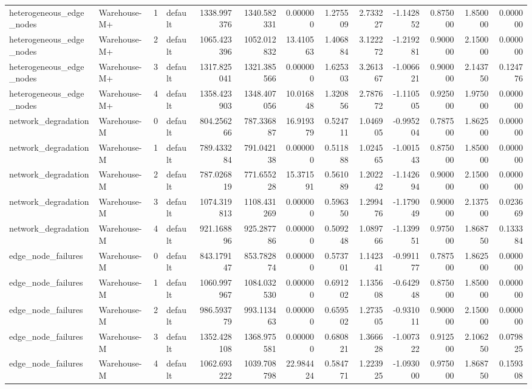 \begin{tabular}{llrlrrrrrrrrr}
heterogeneous\_edge\_nodes & Warehouse-M+ & 1 & default & 1338.997376 & 1340.582331 & 0.000000 & 1.275509 & 2.733227 & -1.142852 & 0.875000 & 1.850000 & 0.000000 \\
heterogeneous\_edge\_nodes & Warehouse-M+ & 2 & default & 1065.423396 & 1052.012832 & 13.410563 & 1.406884 & 3.122272 & -1.219281 & 0.900000 & 2.150000 & 0.000000 \\
heterogeneous\_edge\_nodes & Warehouse-M+ & 3 & default & 1317.825041 & 1321.385566 & 0.000000 & 1.625303 & 3.261367 & -1.006621 & 0.900000 & 2.143750 & 0.124776 \\
heterogeneous\_edge\_nodes & Warehouse-M+ & 4 & default & 1358.423903 & 1348.407056 & 10.016848 & 1.320856 & 2.787672 & -1.110505 & 0.925000 & 1.975000 & 0.000000 \\
network\_degradation & Warehouse-M & 0 & default & 804.256266 & 787.336887 & 16.919379 & 0.524711 & 1.046905 & -0.995204 & 0.787500 & 1.862500 & 0.000000 \\
network\_degradation & Warehouse-M & 1 & default & 789.433284 & 791.042138 & 0.000000 & 0.511888 & 1.024565 & -1.001543 & 0.875000 & 1.850000 & 0.000000 \\
network\_degradation & Warehouse-M & 2 & default & 787.026819 & 771.655228 & 15.371591 & 0.561089 & 1.202242 & -1.142694 & 0.900000 & 2.150000 & 0.000000 \\
network\_degradation & Warehouse-M & 3 & default & 1074.319813 & 1108.431269 & 0.000000 & 0.596350 & 1.299476 & -1.179049 & 0.900000 & 2.137500 & 0.023669 \\
network\_degradation & Warehouse-M & 4 & default & 921.168896 & 925.287786 & 0.000000 & 0.509248 & 1.089766 & -1.139951 & 0.975000 & 1.868750 & 0.133384 \\
edge\_node\_failures & Warehouse-M & 0 & default & 843.179147 & 853.782874 & 0.000000 & 0.573701 & 1.142341 & -0.991177 & 0.787500 & 1.862500 & 0.000000 \\
edge\_node\_failures & Warehouse-M & 1 & default & 1060.997967 & 1084.032530 & 0.000000 & 0.691202 & 1.135608 & -0.642948 & 0.875000 & 1.850000 & 0.000000 \\
edge\_node\_failures & Warehouse-M & 2 & default & 986.593779 & 993.113463 & 0.000000 & 0.659502 & 1.273505 & -0.931011 & 0.900000 & 2.150000 & 0.000000 \\
edge\_node\_failures & Warehouse-M & 3 & default & 1352.428108 & 1368.975581 & 0.000000 & 0.680821 & 1.366628 & -1.007322 & 0.912500 & 2.106250 & 0.079825 \\
edge\_node\_failures & Warehouse-M & 4 & default & 1062.693222 & 1039.708798 & 22.984424 & 0.584771 & 1.223925 & -1.093000 & 0.975000 & 1.868750 & 0.159308 \\

\end{tabular}
